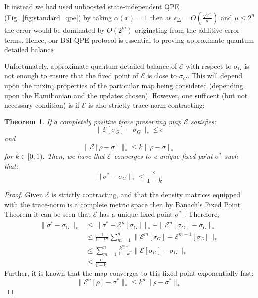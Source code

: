 \documentclass[aps,floatfix,10pt,amssymb,amsfont,amsmath,superscriptaddress,float,nofootinbib,longbibliography,nobalancelastpage,twocolumn]{revtex4-2}
\newtheorem{theorem}{Theorem}
\begin{document}
\begin{widetext}
If instead we had used unboosted state-independent QPE (Fig.~\ref{fig:standard_qpe}) by taking $\alpha(x) =1$ then as $\epsilon_{\Delta} = O(\frac{\sqrt{2^{\eta}}}{\mu})$ and $\mu \leq 2^{\eta}$ the error would be dominated by $O(2^m)$ originating from the additive error terms. Hence, our BSI-QPE protocol is essential to proving approximate quantum detailed balance.
\end{widetext}
 Unfortunately, approximate quantum detailed balance of $\mathcal{E}$ with respect to $\sigma_G$ is not enough to ensure that the fixed point of $\mathcal{E}$ is close to $\sigma_G$. This will depend upon the mixing properties of the particular map being considered (depending upon the Hamiltonian and the updates chosen). However, one sufficent (but not necessary condition) is if $\mathcal{E}$ is also strictly trace-norm contracting:
 \begin{theorem}
     If a completely positive trace preserving map $\mathcal{E}$ satisfies:
     \begin{equation}
         \|\mathcal{E}[\sigma_G] - \sigma_G\|_* \leq \epsilon
     \end{equation}
     and
 \begin{equation}
     \|\mathcal{E}[\rho-\sigma]\|_* \leq k\|\rho-\sigma\|_*
 \end{equation}
 for $k \in [0,1)$. Then, we have that $\mathcal{E}$ converges to a unique fixed point $\sigma^*$ such that:
 \begin{equation}
     \| \sigma^* -\sigma_G\|_* \leq \frac{\epsilon}{1-k}
 \end{equation}
 \label{theorem:error_bound}
 \end{theorem}
 \begin{proof}
     Given $\mathcal{E}$ is strictly contracting, and that the density matrices equipped with the trace-norm is a complete metric space then by Banach’s Fixed Point Theorem it can be seen that $\mathcal{E}$ has a unique fixed point $\sigma^*$ \cite{Mart_nez_Pe_a_2023,Raginsky_2002}.
Therefore,
\begin{align}
 \| \sigma^* -\sigma_G\|_* &\leq \|\sigma^*-\mathcal{E}^n[\sigma_G]\|_* +\|\mathcal{E}^n[\sigma_G] - \sigma_G\|_*\\
     &\leq \frac{1}{1-k^n}\sum_{m=1}^n \| \mathcal{E}^m[\sigma_G] - \mathcal{E}^{m-1}[\sigma_G]\|_*\\
    & \leq \sum_{m=1}^n\frac{k^{m-1}}{1-k^n} \| \mathcal{E}[\sigma_G] - \sigma_G\|_*\\
    &\leq \frac{\epsilon}{1-k}
\end{align}
Further, it is known that the map converges to this fixed point exponentially fast:
\begin{equation}
     \|\mathcal{E}^n[\rho] -\sigma^*\|_* \leq k^n\| \rho - \sigma^*\|_*
\end{equation}
 \end{proof}
\end{document}
